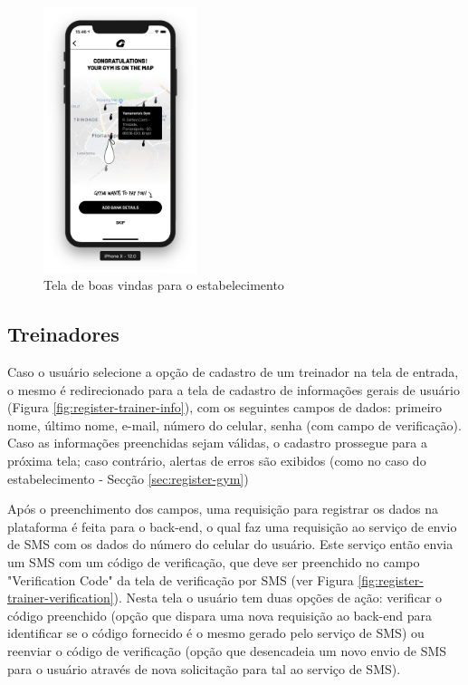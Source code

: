 \begin{figure}[H]
    \centering
    \includegraphics[width=0.4\textwidth]{pfc/figuras/gym-welcome.png}
    \caption{Tela de boas vindas para o estabelecimento}
    \label{fig:gym-welcome}
\end{figure}

\subsection{Treinadores}
Caso o usuário selecione a opção de cadastro de um treinador na tela de entrada, o mesmo é redirecionado para a tela de cadastro de informações gerais de usuário (Figura \ref{fig:register-trainer-info}), com os seguintes campos de dados: primeiro nome, último nome, e-mail, número do celular, senha (com campo de verificação). Caso as informações preenchidas sejam válidas, o cadastro prossegue para a próxima tela; caso contrário, alertas de erros são exibidos (como no caso do estabelecimento - Secção \ref{sec:register-gym})

Após o preenchimento dos campos, uma requisição para registrar os dados na plataforma é feita para o back-end, o qual faz uma requisição ao serviço de envio de SMS com os dados do número do celular do usuário. Este serviço então envia um SMS com um código de verificação, que deve ser preenchido no campo "Verification Code" da tela de verificação por SMS (ver Figura \ref{fig:register-trainer-verification}). Nesta tela o usuário tem duas opções de ação: verificar o código preenchido (opção que dispara uma nova requisição ao back-end para identificar se o código fornecido é o mesmo gerado pelo serviço de SMS) ou reenviar o código de verificação (opção que desencadeia um novo envio de SMS para o usuário através de nova solicitação para tal ao serviço de SMS).

